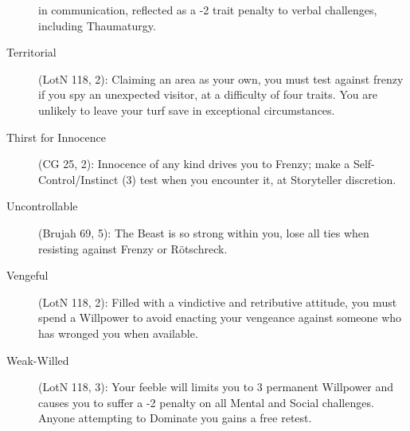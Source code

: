 \begin{description}
	in communication, reflected as a -2 trait penalty to verbal challenges, including Thaumaturgy.
	\item[Territorial] (LotN 118, 2):  Claiming an area as your own, you must test against frenzy 
	if you spy an unexpected visitor, at a difficulty of four traits.  You are unlikely to leave 
	your turf save in exceptional circumstances.
	\item[Thirst for Innocence] (CG 25, 2):  Innocence of any kind drives you to Frenzy; make a 
	Self-Control/Instinct (3) test when you encounter it, at Storyteller discretion.
	\item[Uncontrollable] (Brujah 69, 5):  The Beast is so strong within you, lose all ties when 
	resisting against Frenzy or R\"{o}tschreck.
	\item[Vengeful] (LotN 118, 2):  Filled with a vindictive and retributive attitude, you must 
	spend a Willpower to avoid enacting your vengeance against someone who has wronged you when 
	available.
	\item[Weak-Willed] (LotN 118, 3):  Your feeble will limits you to 3 permanent Willpower and 
	causes you to suffer a -2 penalty on all Mental and Social challenges.  Anyone attempting to 
	Dominate you gains a free retest.
\end{description}

